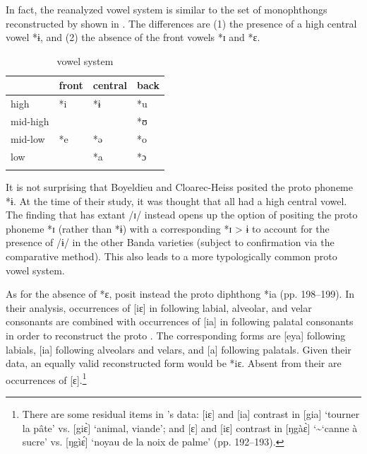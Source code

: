 \documentclass[output=paper,colorlinks,citecolor=brown]{langscibook}
\begin{document}
In fact, the reanalyzed  vowel system  is similar to the set of  monophthongs reconstructed by \cite{BoyeldieuCloarec-Heiss2001} shown in . The differences are (1) the presence of a high central vowel *ɨ, and (2) the absence of the front vowels *ɪ and *ɛ.

\begin{table}
\caption{ vowel system \citep{BoyeldieuCloarec-Heiss2001}}
\label{tab:olson:12}
    \begin{tabular}{llll}
    \lsptoprule
                    & front & central   & back\\
    \midrule
        high        & *i    & *ɨ        & *u\\
        mid-high    &       &           & *ʊ\\
        mid-low     & *e    & *ə        & *o\\
        low         &       & *a        & *ɔ\\
    \lspbottomrule
    \end{tabular}
\end{table}

It is not surprising that Boyeldieu and Cloarec-Heiss posited the proto phoneme *ɨ. At the time of their study, it was thought that all  had a high central vowel. The finding that  has extant /ɪ/ instead opens up the option of positing the proto phoneme *ɪ (rather than *ɨ) with a corresponding  *ɪ > ɨ to account for the presence of /ɨ/ in the other Banda  varieties (subject to confirmation via the comparative method). This also leads to a more typologically  common proto vowel system.

As for the absence of *ɛ, \citeauthor{BoyeldieuCloarec-Heiss2001} posit instead the proto diphthong *ia (pp. 198--199). In their analysis, occurrences of [iɛ] in  following labial, alveolar, and velar consonants are combined with occurrences of [ia] in  following palatal consonants in order to reconstruct the proto . The corresponding  forms are [eya] following labials, [ia] following alveolars and velars, and [a] following palatals. Given their data, an equally valid reconstructed form would be *iɛ. Absent from their  are occurrences of [ɛ].\footnote{There are some residual items in \citeauthor{BoyeldieuCloarec-Heiss2001}'s data: [iɛ] and [ia] contrast in [gia] ‘tourner la pâte’ vs. [giɛ̀] ‘animal, viande’; and [ɛ] and [iɛ] contrast in [ŋgàɛ̀] \char`\~ \space [ŋgɛ̀] ‘canne à sucre’ vs. [ŋgìɛ́] ‘noyau de la noix de palme’ (pp. 192--193).}
\end{document}
